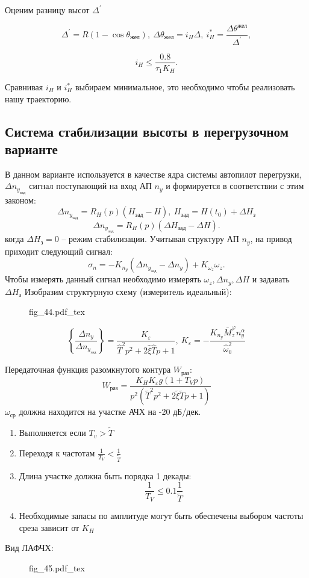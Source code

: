 \documentclass{article}
\newcommand{\incfig}[1]{
    {#1.pdf_tex}
}
\begin{document}
Оценим разницу высот $\Delta^{'}$

\[
    \Delta^{'} = R(1 - \cos{\theta_\text{жел}}), \ \Delta \theta_\text{жел} =
    i_H \Delta, \ i_{H}^* = \frac{\Delta \theta^\text{жел}}{\Delta^{'}},
\]

\[
    i_H \le \frac{0.8}{\tau_1 K_H}
    .\]

Сравнивая $i_H$ и $i_H^*$ выбираем минимальное, это необходимо чтобы
реализовать нашу траекторию.

\subsection{Система стабилизации высоты в перегрузочном варианте}
В данном варианте используется в качестве ядра системы автопилот перегрузки, $
\Delta n_{y_\text{зад}}$ сигнал поступающий на вход АП $n_y$ и формируется в
соответствии с этим законом:
\[
    \Delta n_{y_\text{зад}} = R_H(p) (H_\text{зад} - H), \ H_\text{зад} =
    H(t_0) + \Delta H_\text{з}
\]
\[
    \Delta n_{y_\text{зад}} = R_H(p) (\Delta H_\text{зад} - \Delta H)
    .\]
когда $\Delta H_\text{з} = 0$ -- режим стабилизации. Учитывая структуру АП
$n_y$, на привод приходит следующий сигнал:
\[
    \sigma_n = -K_{n_y} ( \Delta n_{y_\text{зад}} - \Delta n_y) + K_{\omega_z}
    \omega_z
    .\]
Чтобы измерять данный сигнал необходимо измерять $\omega_z, \Delta n_y, \Delta
H$ и задавать $\Delta H_\text{з}$
Изобразим структурную схему (измеритель идеальный):
\begin{figure}[H]
    \centering
    \incfig{fig_44}
    \label{fig:fig_44}
\end{figure}
\[
    \left\{ \frac{ \Delta n_y}{ \Delta n_{y_\text{зад}}} \right\}  =
    \frac{K_\varepsilon}{ \hat{T}^2 p^2 + 2 \hat{\xi} \hat{T}p + 1 }, \
    K_\varepsilon = - \frac{K_{n_y} \bar{M}_z^{\varphi} n_y^\alpha
    }{\hat{\omega}_0^2}
\]

Передаточная функция разомкнутого контура $W_\text{раз}$:
\[
    W_\text{раз}  = \frac{K_H K_\varepsilon g (1 + T_V p)}{p^2 (\tilde{T}^2 p^2
    + 2 \tilde{\xi} \tilde{T}p + 1)}
\]
$\omega_\text{ср}$ должна находится на участке АЧХ на -20 дБ/дек.
\begin{enumerate}
    \item Выполняется если $T_v > \tilde{T}$
    \item Переходя к частотам $\frac{1}{T_V} < \frac{1}{\tilde{T}}$
    \item Длина участке должна быть порядка 1 декады:
          \[
              \frac{1}{T_V} \le 0.1 \frac{1}{\tilde{T}}
          \]
    \item Необходимые запасы по амплитуде могут быть обеспечены выбором частоты
        среза зависит от $K_H$
\end{enumerate}
Вид ЛАФЧХ:
\begin{figure}[H]
    \centering
    \incfig{fig_45}
    \label{fig:fig_45}
\end{figure}
\end{document}
